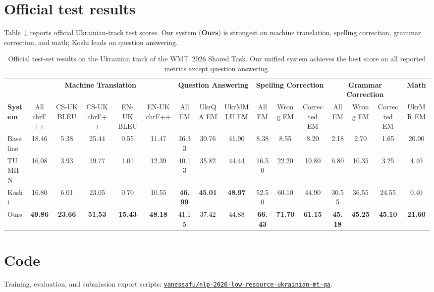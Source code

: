 \documentclass[11pt]{article}
\begin{document}
\section{Official test results}

Table~\ref{tab:official-test} reports official Ukrainian-track test scores.
Our system (\textbf{Ours}) is strongest on machine translation, spelling correction,
grammar correction, and math; Koshi leads on question answering.

\begin{table}[t]
\centering
\small
\setlength{\tabcolsep}{3.5pt}
\caption{Official test-set results on the Ukrainian track of the WMT~2026 Shared Task.
Our unified system achieves the best score on all reported metrics except question answering.}
\label{tab:official-test}
\begin{tabular}{lccccccccccccccc}
\toprule
& \multicolumn{5}{c}{\textbf{Machine Translation}}
& \multicolumn{3}{c}{\textbf{Question Answering}}
& \multicolumn{3}{c}{\textbf{Spelling Correction}}
& \multicolumn{3}{c}{\textbf{Grammar Correction}}
& \textbf{Math} \\
\cmidrule(lr){2-6}\cmidrule(lr){7-9}\cmidrule(lr){10-12}\cmidrule(lr){13-15}\cmidrule(lr){16-16}
\textbf{System}
& All chrF++ & CS-UK BLEU & CS-UK chrF++ & EN-UK BLEU & EN-UK chrF++
& All EM & UkrQA EM & UkrMMLU EM
& All EM & Wrong EM & Corrected EM
& All EM & Wrong EM & Corrected EM
& UkrMR EM \\
\midrule
Baseline
& 18.46 & 5.38 & 25.44 & 0.55 & 11.47
& 36.33 & 30.76 & 41.90
& 8.38 & 8.55 & 8.20
& 2.18 & 2.70 & 1.65
& 20.00 \\
TUMHN
& 16.08 & 3.93 & 19.77 & 1.01 & 12.39
& 40.13 & 35.82 & 44.44
& 16.50 & 22.20 & 10.80
& 6.80 & 10.35 & 3.25
& 4.40 \\
Koshi
& 16.80 & 6.01 & 23.05 & 0.70 & 10.55
& \textbf{46.99} & \textbf{45.01} & \textbf{48.97}
& 52.50 & 60.10 & 44.90
& 30.55 & 36.55 & 24.55
& 0.40 \\
Ours
& \textbf{49.86} & \textbf{23.66} & \textbf{51.53} & \textbf{15.43} & \textbf{48.18}
& 41.15 & 37.42 & 44.88
& \textbf{66.43} & \textbf{71.70} & \textbf{61.15}
& \textbf{45.18} & \textbf{45.25} & \textbf{45.10}
& \textbf{21.60} \\
\bottomrule
\end{tabular}
\end{table}

\section*{Code}

Training, evaluation, and submission export scripts:
\href{https://github.com/vanessafu/nlp-2026-low-resource-ukrainian-mt-qa}{\texttt{vanessafu/nlp-2026-low-resource-ukrainian-mt-qa}}.
\end{document}
